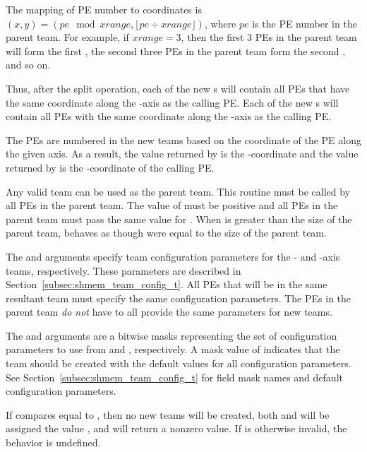 \begin{apidefinition}
{The mapping of \ac{PE} number to coordinates is $(x, y) = ( pe \mod xrange, \lfloor pe \div xrange \rfloor )$,
where $pe$ is the \ac{PE} number in the parent team. For example, if $xrange = 3$,
then the first 3 \acp{PE} in the parent team will form the first
, the second three \acp{PE} in the parent team form the second ,
and so on.

Thus, after the split operation, each of the new s will contain all \acp{PE} that
have the same coordinate along the -axis as the calling \ac{PE}. Each of the
new s will contain all \acp{PE} with the same coordinate along the
-axis as the calling \ac{PE}.

The \acp{PE} are numbered in the new teams based on the coordinate of the
\ac{PE} along the given axis. As a result,
the value returned by  is the
-coordinate and the value returned by 
is the -coordinate of the calling \ac{PE}.

Any valid \openshmem team can be used as the parent team. This routine must be
called by all \acp{PE} in the parent team. The value of  must be
positive and all \acp{PE} in the parent team must pass the same value for
.  When  is greater than the size of the parent team,
 behaves as though  were equal to the
size of the parent team.

The  and  arguments specify team
configuration parameters for the - and -axis teams, respectively.
These parameters are described in Section~\ref{subsec:shmem_team_config_t}.
All \acp{PE} that will be in the same resultant team must specify the same
configuration parameters.
The \acp{PE} in the parent team \emph{do not} have to all provide the same
parameters for new teams.

The  and  arguments are a bitwise masks
representing the set of configuration parameters to use from
 and , respectively.
A mask value of  indicates that the team
should be created with the default values for all configuration parameters.
See Section~\ref{subsec:shmem_team_config_t} for field mask names and
default configuration parameters.

If  compares equal to
, then no new teams will be created,
both  and  will be assigned the
value , and 
will return a nonzero value.
If  is otherwise invalid, the behavior is undefined.

}
\end{apidefinition}

